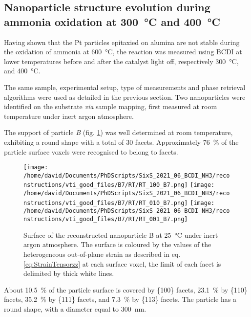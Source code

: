 \subsection{Nanoparticle structure evolution during ammonia oxidation at \qty{300}{\degreeCelsius} and \qty{400}{\degreeCelsius}}\label{sec:BCDIAmmoniaOxidation}


Having shown that the Pt particles epitaxied on alumina are not stable during the oxidation of ammonia at \qty{600}{\degreeCelsius}, the reaction was measured using BCDI at lower temperatures before and after the catalyst light off, respectively \qty{300}{\degreeCelsius}, and \qty{400}{\degreeCelsius}.

The same sample, experimental setup, type of measurements and phase retrieval algorithms were used as detailed in the previous section.
Two nanoparticles were identified on the substrate \textit{via} sample mapping, first measured at room temperature under inert argon atmosphere.

The support of particle \textit{B} (fig. \ref{fig:B7Facets}) was well determined at room temperature, exhibiting a round shape with a total of 30 facets.
Approximately \qty{76}{\percent} of the particle surface voxels were recognised to belong to facets.

\begin{figure}[!htb]
    \centering
    \texttt{[image: /home/david/Documents/PhDScripts/SixS\_2021\_06\_BCDI\_NH3/reconstructions/vti\_good\_files/B7/RT/RT\_100\_B7.png]}
    \texttt{[image: /home/david/Documents/PhDScripts/SixS\_2021\_06\_BCDI\_NH3/reconstructions/vti\_good\_files/B7/RT/RT\_010\_B7.png]}
    \texttt{[image: /home/david/Documents/PhDScripts/SixS\_2021\_06\_BCDI\_NH3/reconstructions/vti\_good\_files/B7/RT/RT\_001\_B7.png]}
    \caption{
        Surface of the reconstructed nanoparticle B at \qty{25}{\degreeCelsius} under inert argon atmosphere.
        The surface is coloured by the values of the heterogeneous out-of-plane strain as described in eq. \ref{eq:StrainTensorzz} at each surface voxel, the limit of each facet is delimited by thick white lines.
    }
    \label{fig:B7Facets}
\end{figure}

About \qty{10.5}{\percent} of the particle surface is covered by \{100\} facets, \qty{23.1}{\percent} by \{110\} facets, \qty{35.2}{\percent} by \{111\} facets, and \qty{7.3}{\percent} by \{113\} facets.
The particle has a round shape, with a diameter equal to \qty{300}{\nm}.

